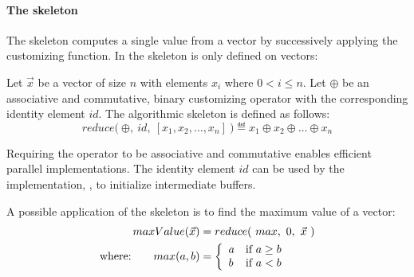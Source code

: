 \paragraph{The \reduce skeleton}
The \reduce skeleton computes a single value from a vector by successively applying the customizing function.
In \SkelCL the \reduce skeleton is only defined on vectors:
\begin{definition}
  \label{definition:reduce}
  Let $\vec{x}$ be a vector of size $n$ with elements $x_i$ where $0 < i \leq n$.
  Let $\oplus$ be an associative and commutative, binary customizing operator with the corresponding identity element $id$.
  The algorithmic skeleton \reduce is defined as follows:
  \begin{equation*}
    reduce \big(\ \oplus,\ id,\ [x_1, x_2, \dots, x_n]\ \big)
      \eqdef x_1 \oplus x_2 \oplus \dots \oplus x_n
  \end{equation*}
\end{definition}
\noindent
Requiring the operator to be associative and commutative enables efficient parallel implementations.
The identity element $id$ can be used by the implementation, \eg, to initialize intermediate buffers.

A possible application of the \reduce skeleton is to find the maximum value of a vector:
\begin{align*}
  maxValue(\vec{x}) &= reduce(\ max,\ 0,\ \vec{x}\ )\\
  \text{where:} \qquad max(a, b) &=
    \left\{
      \begin{array}{l l}
      a & \text{if } a \geq b\\
      b & \text{if } a < b
      \end{array}
    \right.
\end{align*}


